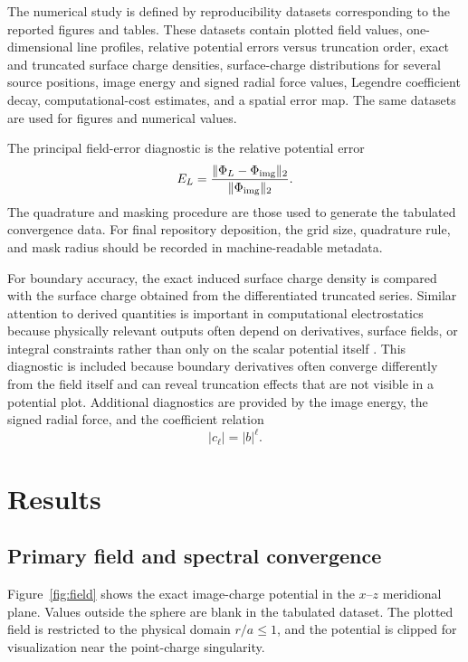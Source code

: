 \documentclass[preprint,12pt]{elsarticle}
\begin{document}
The numerical study is defined by reproducibility datasets corresponding to the reported figures and tables. These datasets contain plotted field values, one-dimensional line profiles, relative potential errors versus truncation order, exact and truncated surface charge densities, surface-charge distributions for several source positions, image energy and signed radial force values, Legendre coefficient decay, computational-cost estimates, and a spatial error map. The same datasets are used for figures and numerical values.

The principal field-error diagnostic is the relative potential error
\begin{equation}
    E_L=\frac{\|\Phi_L-\Phi_{\rm img}\|_2}{\|\Phi_{\rm img}\|_2} .
\label{eq:error}
\end{equation}
The quadrature and masking procedure are those used to generate the tabulated convergence data. For final repository deposition, the grid size, quadrature rule, and mask radius should be recorded in machine-readable metadata.

For boundary accuracy, the exact induced surface charge density is compared with the surface charge obtained from the differentiated truncated series. Similar attention to derived quantities is important in computational electrostatics because physically relevant outputs often depend on derivatives, surface fields, or integral constraints rather than only on the scalar potential itself \cite{jin2014,liu2026}. This diagnostic is included because boundary derivatives often converge differently from the field itself and can reveal truncation effects that are not visible in a potential plot. Additional diagnostics are provided by the image energy, the signed radial force, and the coefficient relation
\begin{equation}
    |c_\ell|=|b|^\ell .
\end{equation}

\section{Results}\label{sec:results}

\subsection{Primary field and spectral convergence}

Figure~\ref{fig:field} shows the exact image-charge potential in the $x$--$z$ meridional plane. Values outside the sphere are blank in the tabulated dataset. The plotted field is restricted to the physical domain $r/a\leq1$, and the potential is clipped for visualization near the point-charge singularity.
\end{document}

